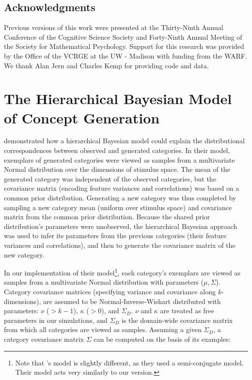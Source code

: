 \documentclass[12pt]{article}
\begin{document}
\begin{flushleft}
\clearpage
\section{Acknowledgments}
Previous versions of this work were presented at the Thirty-Ninth Annual Conference of the Cognitive Science Society and Forty-Ninth Annual Meeting of the Society for Mathematical Psychology. Support for this research was provided by the Office of the VCRGE at the UW - Madison with funding from the WARF. We thank Alan Jern and Charles Kemp for providing code and data.
\end{flushleft}


\clearpage


\clearpage


\appendix
{}

\section{The Hierarchical Bayesian Model of Concept Generation}
\label{ap:hsampling-definition}

\cite{jern2013probabilistic} demonstrated how a hierarchical Bayesian model could explain the distributional correspondences between observed and generated categories. In their model, exemplars of generated categories were viewed as samples from a multivariate Normal distribution over the dimensions of stimulus space. The mean of the generated category was independent of the observed categories, but the covariance matrix (encoding feature variances and correlations) was based on a common prior distribution. Generating a new category was thus completed by sampling a new category mean (uniform over stimulus space) and covariance matrix from the common prior distribution. Because the shared prior distribution's parameters were unobserved, the hierarchical Bayesian approach was used to infer its parameters from the previous categories (their feature variances and correlations), and then to generate the covariance matrix of the new category.

In our implementation of their model\footnote{Note that \citet{jern2013probabilistic}'s model is slightly different, as they used a semi-conjugate model. Their model acts very similarly to our version.}, each category's exemplars are viewed as samples from a multivariate Normal distribution with parameters ($\mu, \Sigma$). Category covariance matrices (specifying variance and covariance along $k$-dimensions), are assumed to be Normal-Inverse-Wishart distributed with parameters: $\nu$ ($>k-1$), $\kappa$ ($>0$), and $\Sigma_D$. $\nu$ and $\kappa$ are treated as free parameters in our simulations, and $\Sigma_D$ is the domain-wide covariance matrix from which all categories are viewed as samples. Assuming a given $\Sigma_D$, a category covariance matrix $\Sigma$ can be computed on the basis of its examples:
\end{document}
